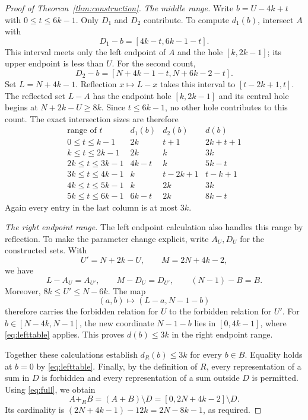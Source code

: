 \documentclass[11pt]{article}
\newcommand{\res}{\mathbin{+_{R}}}
\begin{document}
\begin{proof}[Proof of Theorem~\ref{thm:construction}]
\medskip\noindent\textit{The middle range.}
Write $b=U-4k+t$ with $0\leq t\leq6k-1$. Only $D_1$ and $D_2$ contribute. To compute $d_1(b)$, intersect $A$ with
\[
 D_1-b=[4k-t,6k-1-t].
\]
This interval meets only the left endpoint of $A$ and the hole $[k,2k-1]$; its upper endpoint is less than $U$. For the second count,
\[
 D_2-b=[N+4k-1-t,N+6k-2-t].
\]
Set $L=N+4k-1$. Reflection $x\mapsto L-x$ takes this interval to $[t-2k+1,t]$. The reflected set $L-A$ has the endpoint hole $[k,2k-1]$ and its central hole begins at $N+2k-U\geq8k$. Since $t\leq6k-1$, no other hole contributes to this count. The exact intersection sizes are therefore
\begin{equation}\label{eq:middletable}
\begin{array}{c|c|c|c}
 \text{range of }t&d_1(b)&d_2(b)&d(b)\\\hline
 0\leq t\leq k-1&2k&t+1&2k+t+1\\
 k\leq t\leq2k-1&2k&k&3k\\
 2k\leq t\leq3k-1&4k-t&k&5k-t\\
 3k\leq t\leq4k-1&k&t-2k+1&t-k+1\\
 4k\leq t\leq5k-1&k&2k&3k\\
 5k\leq t\leq6k-1&6k-t&2k&8k-t
\end{array}
\end{equation}
Again every entry in the last column is at most $3k$.

\medskip\noindent\textit{The right endpoint range.}
The left endpoint calculation also handles this range by reflection. To make the parameter change explicit, write $A_U,D_U$ for the constructed sets. With
\[
 U'=N+2k-U,\qquad M=2N+4k-2,
\]
we have
\[
 L-A_U=A_{U'},\qquad M-D_U=D_{U'},\qquad (N-1)-B=B.
\]
Moreover, $8k\leq U'\leq N-6k$. The map
\[
 (a,b)\longmapsto(L-a,N-1-b)
\]
therefore carries the forbidden relation for $U$ to the forbidden relation for $U'$. For $b\in[N-4k,N-1]$, the new coordinate $N-1-b$ lies in $[0,4k-1]$, where \eqref{eq:lefttable} applies. This proves $d(b)\leq3k$ in the right endpoint range.

Together these calculations establish $d_R(b)\leq3k$ for every $b\in B$. Equality holds at $b=0$ by \eqref{eq:lefttable}. Finally, by the definition of $R$, every representation of a sum in $D$ is forbidden and every representation of a sum outside $D$ is permitted. Using \eqref{eq:full}, we obtain
\[
 A\res B=(A+B)\setminus D=[0,2N+4k-2]\setminus D.
\]
Its cardinality is $(2N+4k-1)-12k=2N-8k-1$, as required.
\end{proof}
\end{document}
